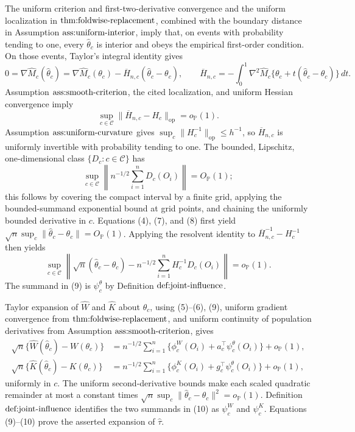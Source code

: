 The uniform criterion and first-two-derivative convergence and the uniform localization in \(\textnormal{thm:foldwise-replacement}\), combined with the boundary distance in Assumption \(\textnormal{ass:uniform-interior}\), imply that, on events with probability tending to one, every \(\widehat\theta_c\) is interior and obeys the empirical first-order condition.  On those events, Taylor's integral identity gives
\[
 0=\nabla\widehat M_c(\widehat\theta_c)
 =\nabla\widehat M_c(\theta_c)
  -\overline H_{n,c}(\widehat\theta_c-\theta_c),
 \qquad
 \overline H_{n,c}=-\int_0^1\nabla^2\widehat M_c
 \{\theta_c+t(\widehat\theta_c-\theta_c)\}\,dt. \tag{7}
\]
Assumption \(\textnormal{ass:smooth-criterion}\), the cited localization, and uniform Hessian convergence imply
\[
 \sup_{c\in\mathcal C}\|\overline H_{n,c}-H_c\|_{\mathrm{op}}
 =o_{\mathbb P}(1).
\]
Assumption \(\textnormal{ass:uniform-curvature}\) gives \(\sup_c\|H_c^{-1}\|_{\mathrm{op}}\le h^{-1}\), so \(\overline H_{n,c}\) is uniformly invertible with probability tending to one.  The bounded, Lipschitz, one-dimensional class \(\{D_c:c\in\mathcal C\}\) has
\[
 \sup_{c\in\mathcal C}\left\|n^{-1/2}\sum_{i=1}^nD_c(O_i)\right\|=O_{\mathbb P}(1); \tag{8}
\]
this follows by covering the compact interval by a finite grid, applying the bounded-summand exponential bound at grid points, and chaining the uniformly bounded derivative in \(c\).  Equations (4), (7), and (8) first yield \(\sqrt n\sup_c\|\widehat\theta_c-\theta_c\|=O_{\mathbb P}(1)\).  Applying the resolvent identity to \(\overline H_{n,c}^{-1}-H_c^{-1}\) then yields
\[
 \sup_{c\in\mathcal C}\left\|
 \sqrt n(\widehat\theta_c-\theta_c)
 -n^{-1/2}\sum_{i=1}^nH_c^{-1}D_c(O_i)
 \right\|=o_{\mathbb P}(1). \tag{9}
\]
The summand in (9) is \(\psi_c^\theta\) by Definition \(\textnormal{def:joint-influence}\).

Taylor expansion of \(\widehat W\) and \(\widehat K\) about \(\theta_c\), using (5)--(6), (9), uniform gradient convergence from \(\textnormal{thm:foldwise-replacement}\), and uniform continuity of population derivatives from Assumption \(\textnormal{ass:smooth-criterion}\), gives
\[
\begin{aligned}
 \sqrt n\{\widehat W(\widehat\theta_c)-W(\theta_c)\}
 &=n^{-1/2}\sum_{i=1}^n
 \{\phi_c^W(O_i)+a_c^\top\psi_c^\theta(O_i)\}+o_{\mathbb P}(1),\\
 \sqrt n\{\widehat K(\widehat\theta_c)-K(\theta_c)\}
 &=n^{-1/2}\sum_{i=1}^n
 \{\phi_c^K(O_i)+g_c^\top\psi_c^\theta(O_i)\}+o_{\mathbb P}(1),
\end{aligned} \tag{10}
\]
uniformly in \(c\).  The uniform second-derivative bounds make each scaled quadratic remainder at most a constant times
\(
 \sqrt n\sup_c\|\widehat\theta_c-\theta_c\|^2=o_{\mathbb P}(1)
\).
Definition \(\textnormal{def:joint-influence}\) identifies the two summands in (10) as \(\psi_c^W\) and \(\psi_c^K\).  Equations (9)--(10) prove the asserted expansion of \(\widehat\tau\).

